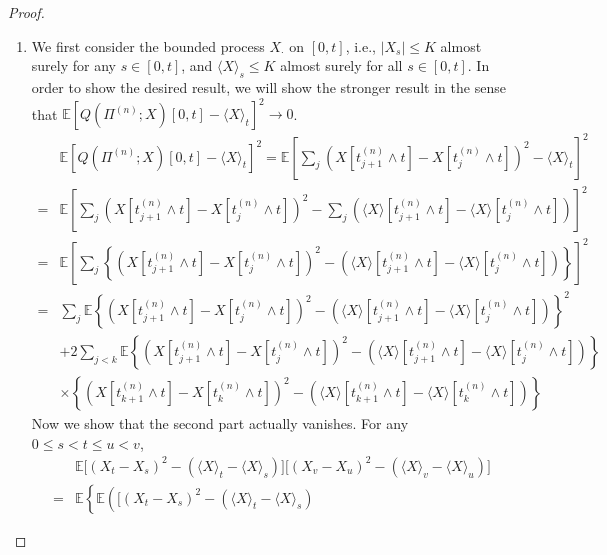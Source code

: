 \begin{proof}
\begin{enumerate}
\item
We first consider the bounded process $X_{\cdot}$ on $[0,t]$, i.e., $|X_s|\le K$ almost surely for any $s\in[0,t]$, and $\langle X\rangle_s\le K$ almost surely for all $s\in[0,t]$.
In order to show the desired result, we will show the stronger result in the sense that $\mathbb{E}\left[
Q(\Pi^{(n)};X)[0,t] - \langle X\rangle_t
\right]^2\to0$.
\begin{equation}\label{Eq:11:2}
\begin{aligned}
&\mathbb{E}\left[
Q(\Pi^{(n)};X)[0,t] - \langle X\rangle_t
\right]^2=
\mathbb{E}\left[
\sum_j
\left(
X[t_{j+1}^{(n)}\land t] - X[t_{j}^{(n)}\land t]
\right)^2
- \langle X\rangle_t
\right]^2\\
=&
\mathbb{E}\left[
\sum_j
\left(
X[t_{j+1}^{(n)}\land t] - X[t_{j}^{(n)}\land t]
\right)^2
- 
\sum_j
\left(
\langle X\rangle[t_{j+1}^{(n)}\land t] - \langle X\rangle[t_{j}^{(n)}\land t]
\right)
\right]^2\\
=&
\mathbb{E}\left[
\sum_j
\left\{
\left(
X[t_{j+1}^{(n)}\land t] - X[t_{j}^{(n)}\land t]
\right)^2
- 
\left(
\langle X\rangle[t_{j+1}^{(n)}\land t] - \langle X\rangle[t_{j}^{(n)}\land t]
\right)
\right\}
\right]^2\\
=&
\sum_j
\mathbb{E}
\left\{
\left(
X[t_{j+1}^{(n)}\land t] - X[t_{j}^{(n)}\land t]
\right)^2
- 
\left(
\langle X\rangle[t_{j+1}^{(n)}\land t] - \langle X\rangle[t_{j}^{(n)}\land t]
\right)
\right\}^2\\
&+2\sum_{j<k}\mathbb{E}\left\{\left(
X[t_{j+1}^{(n)}\land t] - X[t_{j}^{(n)}\land t]
\right)^2
- 
\left(
\langle X\rangle[t_{j+1}^{(n)}\land t] - \langle X\rangle[t_{j}^{(n)}\land t]
\right)\right\}\\
&\times
\left\{\left(
X[t_{k+1}^{(n)}\land t] - X[t_{k}^{(n)}\land t]
\right)^2
- 
\left(
\langle X\rangle[t_{k+1}^{(n)}\land t] - \langle X\rangle[t_{k}^{(n)}\land t]
\right)\right\}
\end{aligned}
\end{equation}
Now we show that the second part actually vanishes.
For any $0\le s<t\le u<v$,
\begin{equation}\label{Eq:11:3}
\begin{aligned}
&\mathbb{E}\bigg[
(X_t-X_s)^2 - (\langle X\rangle_t- \langle X\rangle_s)
\bigg]
\bigg[
(X_v-X_u)^2 - (\langle X\rangle_v- \langle X\rangle_u)
\bigg]\\
=&\mathbb{E}\left\{\mathbb{E}\left(\bigg[
(X_t-X_s)^2 - (\langle X\rangle_t- \langle X\rangle_s)

\end{aligned}
\end{equation}
\end{enumerate}
\end{proof}
